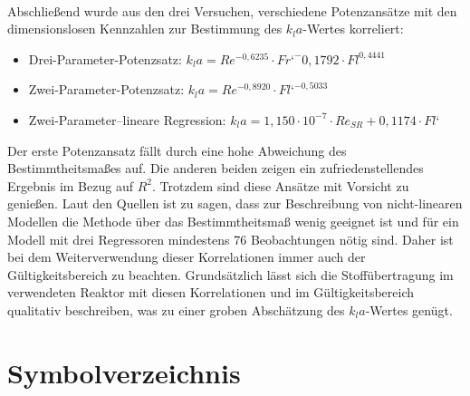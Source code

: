 \documentclass[12pt,liststotoc]{report}
\begin{document}
\\
Abschließend wurde aus den drei Versuchen, verschiedene Potenzansätze mit den dimensionslosen Kennzahlen zur Bestimmung des $k_la$-Wertes korreliert:
\begin{itemize}
    \item Drei-Parameter-Potenzsatz:	$k_la = Re^{−0,6235} \cdot Fr‘^-{0,1792} \cdot Fl^{0,4441}$ 
    \item 	Zwei-Parameter-Potenzsatz:	$k_la = Re^{−0,8920} \cdot Fl‘^{-0,5033}$
    \item Zwei-Parameter–lineare Regression: $k_la=1,150 \cdot 10^{-7} \cdot Re_{SR} + 0,1174 \cdot Fl‘$
\end{itemize}

Der erste Potenzansatz fällt durch eine hohe Abweichung des Bestimmtheitsmaßes auf. Die anderen beiden zeigen ein zufriedenstellendes Ergebnis im Bezug auf $R^2$. Trotzdem sind diese Ansätze mit Vorsicht zu genießen. Laut den Quellen \cite{rquadrat,regression} ist zu sagen, dass zur Beschreibung von nicht-linearen Modellen die Methode über das Bestimmtheitsmaß wenig geeignet ist und für ein Modell mit drei Regressoren mindestens 76 Beobachtungen nötig sind. Daher ist bei dem Weiterverwendung dieser Korrelationen immer auch der Gültigkeitsbereich zu beachten. Grundsätzlich lässt sich die Stoffübertragung im verwendeten Reaktor mit diesen Korrelationen und im Gültigkeitsbereich qualitativ beschreiben, was zu einer groben Abschätzung des $k_la$-Wertes genügt.


\newpage
{}

\newpage
\setcounter{page}{2}

\newpage
\listoffigures
{} 

\newpage
\listoftables
{} 

\newpage
\chapter*{Symbolverzeichnis}
\end{document}
